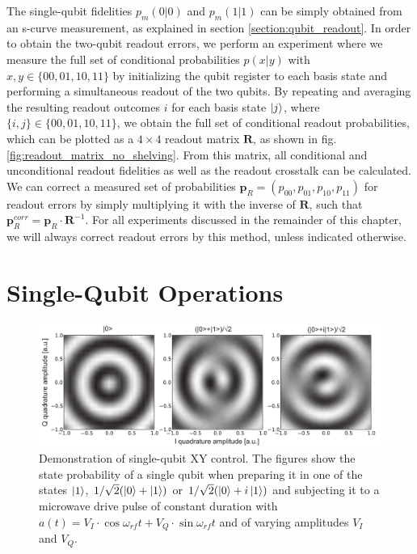 The single-qubit fidelities $p_m(0|0)$ and $p_m(1|1)$ can be simply obtained from an s-curve measurement, as explained in section \ref{section:qubit_readout}. In order to obtain the two-qubit readout errors, we perform an experiment where we measure the full set of conditional probabilities $p(x|y)$ with $x,y\in\{00,01,10,11\}$ by initializing the qubit register to each basis state and performing a simultaneous readout of the two qubits. By repeating and averaging the resulting readout outcomes $i$ for each basis state $\left| j \right>$, where $\{i,j\}\in\{00,01,10,11\}$, we obtain the full set of conditional readout probabilities, which can be plotted as a $4\times 4$ readout matrix $\mathbf{R}$, as shown in fig. \ref{fig:readout_matrix_no_shelving}. From this matrix, all conditional and unconditional readout fidelities as well as the readout crosstalk can be calculated. We can correct a measured set of probabilities $\mathbf{p}_R=(p_{00},p_{01},p_{10},p_{11})$ for readout errors by simply multiplying it with the inverse of $\mathbf{R}$, such that $\mathbf{p}_R^{corr}=\mathbf{p}_R\cdot \mathbf{R}^{-1}$. For all experiments discussed in the remainder of this chapter, we will always correct readout errors by this method, unless indicated otherwise.

\section{Single-Qubit Operations}

\begin{figure}[ht!]
	\centering
		\includegraphics[width=1.\textwidth]{"./data/ct5/2010_12_01 - iq tomography/iq_tomographies"}
	\caption[Demonstration of single-qubit XY control]{Demonstration of single-qubit XY control. The figures show the state probability of a single qubit when preparing it in one of the states $\left| 1 \right>$, $1/\sqrt{2}(\left| 0 \right>+\left| 1 \right>)$ or $1/\sqrt{2}(\left| 0 \right>+i\left| 1 \right>)$ and subjecting it to a microwave drive pulse of constant duration with $a(t) = V_I\cdot\cos{\omega_{rf}t}+V_Q\cdot\sin{\omega_{rf}t}$ and of varying amplitudes $V_I$ and $V_Q$.}
	\label{fig:single_qubit_iq_control}
\end{figure}

